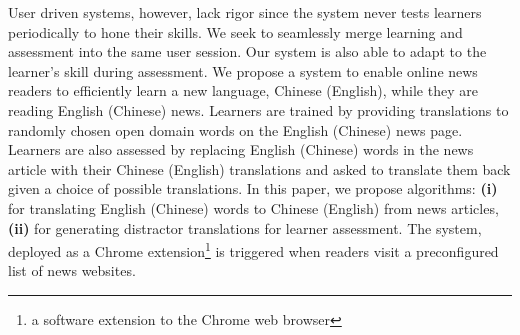 User driven systems, however, lack rigor since the system never tests learners periodically to hone their skills. We seek to seamlessly merge learning and assessment into the same user session. %
Our system is also able to adapt to the learner's skill during assessment.
We propose a system to enable online news readers to efficiently learn 
a new language, Chinese (English), while they are reading English (Chinese) news. Learners are trained by providing translations to randomly chosen open domain words on the English (Chinese) news page. Learners are also assessed by replacing English (Chinese) words in the news article with their Chinese (English) translations and  asked to translate them back given a choice of possible translations. In this paper, 
we propose algorithms: \textbf{(i)} for translating English (Chinese) words to Chinese (English) from news articles, \textbf{(ii)} for generating distractor translations for learner assessment.
The system, deployed as a Chrome extension\footnote{a software extension to the Chrome web browser} is triggered when readers visit a preconfigured list of news websites.

